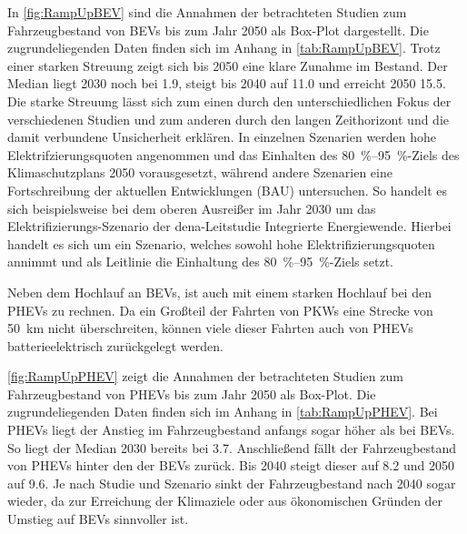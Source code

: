 In \autoref{fig:RampUpBEV} sind die Annahmen der betrachteten Studien zum Fahrzeugbestand von \glspl{BEV} bis zum Jahr \num{2050} als Box-Plot dargestellt.
Die zugrundeliegenden Daten finden sich im Anhang in \autoref{tab:RampUpBEV}.
Trotz einer starken Streuung zeigt sich bis \num{2050} eine klare Zunahme im Bestand.
Der Median liegt 2030 noch bei \SI{1.9}{\MioStk}, steigt bis \num{2040} auf \SI{11.0}{\MioStk} und erreicht \num{2050} \SI{15.5}{\MioStk}.
Die starke Streuung lässt sich zum einen durch den unterschiedlichen Fokus der verschiedenen Studien und zum anderen durch den langen Zeithorizont und die damit verbundene Unsicherheit erklären.
In einzelnen Szenarien werden hohe Elektrifzierungsquoten angenommen und das Einhalten des \SIrange[range-phrase=~{--}~]{80}{95}{\percent}-Ziels des Klimaschutzplans \num{2050} vorausgesetzt, während andere Szenarien eine Fortschreibung der aktuellen Entwicklungen (\gls{BAU}) untersuchen.
So handelt es sich beispielsweise bei dem oberen Ausreißer im Jahr 2030 um das Elektrifizierungs-Szenario der dena-Leitstudie \glqq Integrierte Energiewende\grqq \cite{DEAGH2018}.
Hierbei handelt es sich um ein Szenario, welches sowohl hohe Elektrifizierungsquoten annimmt und als Leitlinie die Einhaltung des  \SIrange[range-phrase=~{--}~]{80}{95}{\percent}-Ziels setzt.\medskip

Neben dem Hochlauf an \glspl{BEV}, ist auch mit einem starken Hochlauf bei den \glspl{PHEV} zu rechnen.
Da ein Großteil der Fahrten von \glspl{PKW} eine Strecke von \SI{50}{\km} nicht überschreiten, können viele dieser Fahrten auch von \glspl{PHEV} batterieelektrisch zurückgelegt werden. \cite{Agora2019}



\autoref{fig:RampUpPHEV} zeigt die Annahmen der betrachteten Studien zum Fahrzeugbestand von \glspl{PHEV} bis zum Jahr \num{2050} als Box-Plot.
Die zugrundeliegenden Daten finden sich im Anhang in \autoref{tab:RampUpPHEV}.
Bei \glspl{PHEV} liegt der Anstieg im Fahrzeugbestand anfangs sogar höher als bei \glspl{BEV}.
So liegt der Median 2030 bereits bei \SI{3.7}{\MioStk}.
Anschließend fällt der Fahrzeugbestand von \glspl{PHEV} hinter den der \glspl{BEV} zurück.
Bis \num{2040} steigt dieser auf \SI{8.2}{\MioStk} und \num{2050} auf \SI{9.6}{\MioStk}.
Je nach Studie und Szenario sinkt der Fahrzeugbestand nach \num{2040} sogar wieder, da zur Erreichung der Klimaziele oder aus ökonomischen Gründen der Umstieg auf \glspl{BEV} sinnvoller ist.

